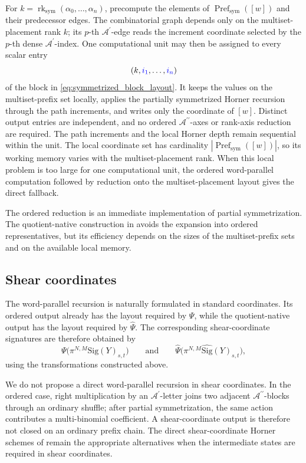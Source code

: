 \documentclass{amsart}
\theoremstyle{definition}
\theoremstyle{remark}
\newcommand{\Sig}[1]{\mathrm{Sig}(#1)}
\newcommand{\Sigsym}[1]{\widehat{\mathrm{Sig}}(#1)}
\newcommand{\blue}[1]{{\color{blue}#1}}
\begin{document}
\begin{implrmk}
For
$k=\operatorname{rk}_{\mathrm{sym}}
(\alpha_0,\ldots,\alpha_n)$, precompute the elements of
$\operatorname{Pref}_{\mathrm{sym}}([w])$ and their predecessor edges. The
combinatorial graph depends only on the multiset-placement rank $k$; its
$p$-th $\mathcal{A}^{\prime}$-edge reads the increment coordinate selected
by the $p$-th dense $\mathcal{A}^{\prime}$-index. One computational unit
may then be assigned to every scalar entry
\[
    \left(
        k,
        \blue{i_1},\ldots,\blue{i_n}
    \right)
\]
of the block in \eqref{eq:symmetrized_block_layout}. It keeps the values on
the multiset-prefix set locally, applies the partially symmetrized Horner
recursion through the path increments, and writes only the coordinate of
$[w]$. Distinct output entries are independent, and no ordered
$\mathcal{A}^{\prime\prime}$-axes or rank-axis reduction are required. The
path increments and the local Horner depth remain sequential within the
unit. The local coordinate set has cardinality
$|\operatorname{Pref}_{\mathrm{sym}}([w])|$, so its working memory varies
with the multiset-placement rank. When this local problem is too large for
one computational unit, the ordered word-parallel computation followed by
reduction onto the multiset-placement layout gives the direct fallback.
\end{implrmk}

The ordered reduction is an immediate implementation of partial
symmetrization. The quotient-native construction in
 avoids the expansion into ordered
representatives, but its efficiency depends on the sizes of the
multiset-prefix sets and on the available local memory.

\subsection{Shear coordinates}

The word-parallel recursion is naturally formulated in standard
coordinates. Its ordered output already has the layout required by $\Psi$,
while the quotient-native output has the layout required by
$\widehat{\Psi}$. The corresponding shear-coordinate signatures are
therefore obtained by
\[
    \Psi\bigl(\pi^{N,M}\Sig{Y}_{s,t}\bigr)
    \qquad\text{and}\qquad
    \widehat{\Psi}
    \bigl(\pi^{N,M}\Sigsym{Y}_{s,t}\bigr),
\]
using the transformations constructed above.

We do not propose a direct word-parallel recursion in shear coordinates.
In the ordered case, right multiplication by an
$\mathcal{A}^{\prime}$-letter joins two adjacent
$\mathcal{A}^{\prime\prime}$-blocks through an ordinary shuffle; after
partial symmetrization, the same action contributes a multi-binomial
coefficient. A shear-coordinate output is therefore not closed on an
ordinary prefix chain. The direct shear-coordinate Horner schemes of
remain the appropriate alternatives when the intermediate states are
required in shear coordinates.
\end{document}
